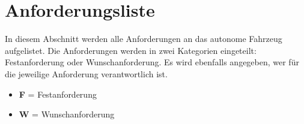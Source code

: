 \documentclass[../main.tex]{subfiles}
\begin{document}
\newpage
\section{Anforderungsliste}
\label{sec:anforderungsliste}

In diesem Abschnitt werden alle Anforderungen an das autonome Fahrzeug aufgelistet.  
Die Anforderungen werden in zwei Kategorien eingeteilt: Festanforderung oder Wunschanforderung.  
Es wird ebenfalls angegeben, wer für die jeweilige Anforderung verantwortlich ist.

\begin{multicols}{2}
\begin{itemize}
  \item {\bf F} = Festanforderung
  \item {\bf W} = Wunschanforderung
\end{itemize}

\columnbreak


\end{multicols}
\end{document}
